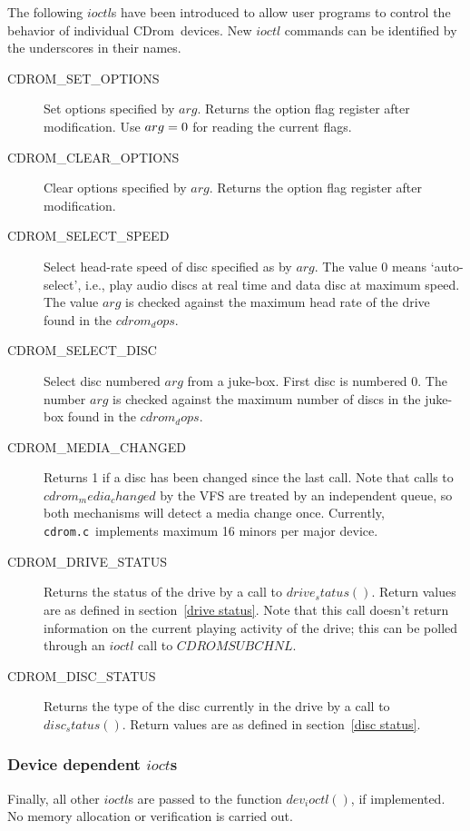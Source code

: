 \documentclass{article}
\def\cdrom{{\sc CDrom}}
\def\cdromc{{\tt cdrom.c}}
\begin{document}
The following $ioctl$s have been introduced to allow user programs to
control the behavior of individual \cdrom\ devices. New $ioctl$
commands can be identified by the underscores in their names.
\begin{description}
\item[CDROM_SET_OPTIONS] Set options specified by $arg$. Returns the
option flag register after modification. Use  $arg = \rm0$ for reading
the current flags.
\item[CDROM_CLEAR_OPTIONS] Clear options specified by $arg$. Returns
  the option flag register after modification.
\item[CDROM_SELECT_SPEED] Select head-rate speed of disc specified as
  by $arg$. The value 0 means `auto-select', i.e., play audio discs at
  real time and data disc at maximum speed. The value $arg$ is
  checked against the maximum head rate of the drive found in
  the $cdrom_dops$.
\item[CDROM_SELECT_DISC] Select disc numbered $arg$ from a juke-box.
  First disc is numbered 0. The number $arg$ is checked against the
  maximum number of discs in the juke-box found in the $cdrom_dops$.
\item[CDROM_MEDIA_CHANGED] Returns 1 if a disc has been changed since
  the last call. Note that calls to $cdrom_media_changed$ by the VFS
  are treated by an independent queue, so both mechanisms will detect
  a media change once. Currently, \cdromc\ implements maximum 16 minors
  per major device.
\item[CDROM_DRIVE_STATUS] Returns the status of the drive by a call to
  $drive_status()$. Return values are as defined in section~\ref{drive
    status}. Note that this call doesn't return information on the
  current playing activity of the drive; this can be polled through an
  $ioctl$ call to $CDROMSUBCHNL$.
\item[CDROM_DISC_STATUS] Returns the type of the disc currently in the
  drive by a call to $disc_status()$. Return values are as defined in
  section~\ref{disc status}.
\end{description}

\subsubsection{Device dependent $ioct$s}

Finally, all other $ioctl$s are passed to the function $dev_ioctl()$,
if implemented. No memory allocation or verification is carried out. 
\end{document}
